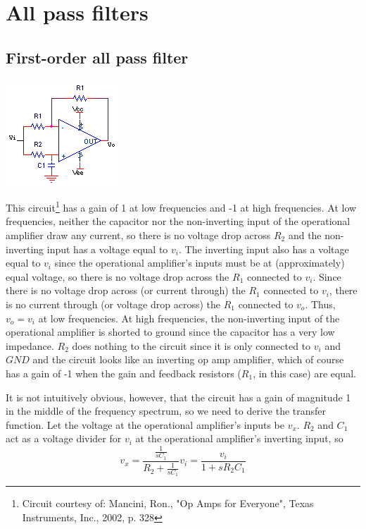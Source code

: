 \section{All pass filters}
\subsection{First-order all pass filter}
\begin{center}
	\includegraphics{schematics/1storderallpassfilter.PNG}
\end{center}
This circuit\footnote{Circuit courtesy of: Mancini, Ron., "Op Amps for Everyone", Texas Instruments, Inc., 2002, p. 328} has a gain of 1 at low frequencies and -1 at high frequencies. At low frequencies, neither the capacitor nor the non-inverting input of the operational amplifier draw any current, so there is no voltage drop across $R_{2}$ and the non-inverting input has a voltage equal to $v_{i}$. The inverting input also has a voltage equal to $v_{i}$ since the operational amplifier's inputs must be at (approximately) equal voltage, so there is no voltage drop across the $R_{1}$ connected to $v_{i}$. Since there is no voltage drop across (or current through) the $R_{1}$ connected to $v_{i}$, there is no current through (or voltage drop across) the $R_{1}$ connected to $v_{o}$. Thus, $v_{o} = v_{i}$ at low frequencies. At high frequencies, the non-inverting input of the operational amplifier is shorted to ground since the capacitor has a very low impedance. $R_{2}$ does nothing to the circuit since it is only connected to $v_{i}$ and $GND$ and the circuit looks like an inverting op amp amplifier, which of course has a gain of -1 when the gain and feedback resistors ($R_{1}$, in this case) are equal.
\par It is not intuitively obvious, however, that the circuit has a gain of magnitude 1 in the middle of the frequency spectrum, so we need to derive the transfer function. Let the voltage at the operational amplifier's inputs be $v_{x}$. $R_{2}$ and $C_{1}$ act as a voltage divider for $v_{i}$ at the operational amplifier's inverting input, so
\begin{equation}v_{x} = \frac{\frac{1}{sC_{1}}}{R_{2}+\frac{1}{sC_{1}}}v_{i} = \frac{v_{i}}{1+sR_{2}C_{1}}
\end{equation}
